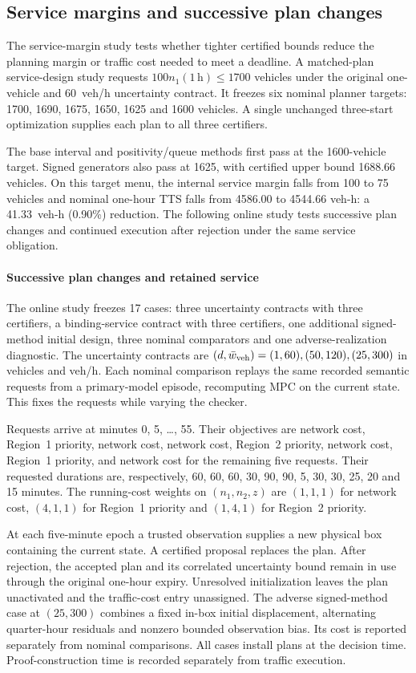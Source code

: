 \documentclass[preprint,12pt]{elsarticle}
\begin{document}
\subsection{Service margins and successive plan changes}

The service-margin study tests whether tighter certified bounds reduce
the planning margin or traffic cost needed to meet a deadline. A matched-plan
service-design study requests $100n_1(1\,\mathrm h)\le1700$ vehicles under
the original one-vehicle and 60~veh/h uncertainty contract. It freezes
six nominal planner targets: 1700, 1690, 1675, 1650, 1625 and 1600 vehicles.
A single unchanged three-start optimization supplies each plan to all
three certifiers.

The base interval and positivity/queue methods first pass at the 1600-vehicle
target. Signed generators also pass at 1625, with certified upper bound
1688.66 vehicles. On this target menu, the internal service margin
falls from 100 to 75 vehicles and nominal one-hour TTS falls from 4586.00
to 4544.66 veh-h: a 41.33~veh-h (0.90\%) reduction. The following online study tests successive plan changes and
continued
execution after rejection under the same service obligation.

\paragraph{Successive plan changes and retained service}
The online study freezes 17 cases: three uncertainty contracts with three
certifiers, a binding-service contract with three certifiers, one additional
signed-method initial design, three nominal comparators and one
adverse-realization diagnostic. The uncertainty contracts are $(d,\bar w_{\rm veh})
=(1,60),(50,120),(25,300)$ in vehicles and veh/h. Each nominal
comparison replays the same recorded semantic requests from a primary-model
episode, recomputing MPC on the current state. This fixes the requests
while varying the checker.

Requests arrive at minutes 0, 5, \ldots, 55. Their objectives are network
cost, Region~1 priority, network cost, network cost, Region~2 priority,
network cost, Region~1 priority, and network cost for the remaining five
requests. Their requested durations are, respectively, 60, 60, 60, 30, 90,
90, 5, 30, 30, 25, 20 and 15 minutes. The running-cost weights on
$(n_1,n_2,z)$ are $(1,1,1)$ for network cost, $(4,1,1)$ for Region~1
priority and $(1,4,1)$ for Region~2 priority.

At each five-minute epoch a trusted observation supplies a new physical
box containing the current state. A certified proposal replaces the plan.
After rejection, the accepted plan
and its correlated uncertainty bound remain in use through the original
one-hour expiry. Unresolved initialization leaves the plan unactivated and
the traffic-cost entry unassigned. The adverse signed-method case at
$(25,300)$ combines a fixed in-box initial displacement, alternating
quarter-hour residuals and nonzero bounded observation bias. Its cost is
reported separately from nominal comparisons. All cases install plans at
the decision time. Proof-construction time is
recorded separately from traffic execution.
\end{document}
